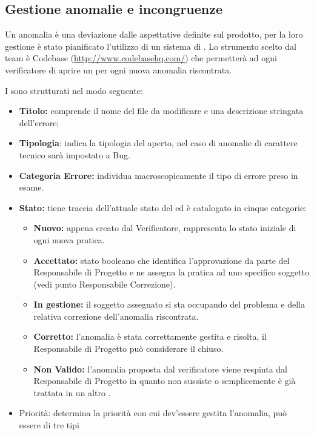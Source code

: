 \subsection{Gestione anomalie e incongruenze}
Un anomalia è una deviazione dalle aspettative definite sul prodotto, per la loro gestione è stato pianificato l'utilizzo di un sistema di .
Lo strumento scelto dal team è Codebase (\url{http://www.codebasehq.com/}) che permetterà ad ogni verificatore di aprire un \underline{} per ogni nuova anomalia riscontrata.

I  sono strutturati nel modo seguente:
\begin{itemize}
\item \textbf{Titolo:} comprende il nome del file da modificare e una descrizione stringata dell'errore;
\item \textbf{Tipologia}: indica la tipologia del  aperto, nel caso di anomalie di carattere tecnico sarà impostato a Bug.
\item \textbf{Categoria Errore:} individua macroscopicamente il tipo di errore preso in esame.
\item \textbf{Stato:} tiene traccia dell'attuale stato del  ed è catalogato in cinque categorie:
\begin{itemize}
\item \textbf{Nuovo:}  appena creato dal Verificatore, rappresenta lo stato iniziale di ogni nuova pratica.
\item \textbf{Accettato:} stato booleano che identifica l'approvazione da parte del Responsabile di Progetto e ne assegna la pratica ad uno specifico soggetto (vedi punto Responsabile Correzione).
\item \textbf{In gestione:} il soggetto assegnato si sta occupando del problema e della relativa correzione dell'anomalia riscontrata.
\item \textbf{Corretto:} l'anomalia è stata correttamente gestita e risolta, il Responsabile di Progetto può considerare il  chiuso.
\item \textbf{Non Valido:} l'anomalia proposta dal verificatore viene respinta dal Responsabile di Progetto in quanto non sussiste o semplicemente è già trattata in un altro .
\end{itemize}
\item Priorità: determina la priorità con cui dev'essere gestita l'anomalia, può essere di tre tipi
\begin{description}

\end{description}
\end{itemize}
